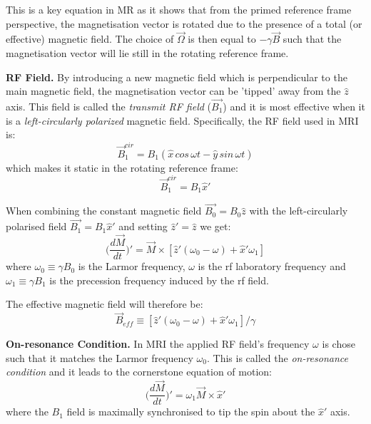This is a key equation in MR as it shows that from the primed reference frame perspective, the magnetisation vector is rotated due to the presence of a total (or effective) magnetic field. The choice of $\vec{\Omega}$ is then equal to $- \gamma \vec{B}$ such that the magnetisation vector will lie still in the rotating reference frame.

\hfill

\textbf{RF Field.} By introducing a new magnetic field which is perpendicular to the main magnetic field, the magnetisation vector can be 'tipped' away from the $\hat{z}$ axis. This field is called the \textit{transmit RF field} ($\vec{B_1}$) and it is most effective when it is a \textit{left-circularly polarized} magnetic field. Specifically, the RF field used in MRI is:
\begin{equation}\label{eq:324}
    \vec{B}_{1}^{cir} = B_1 (\hat{x} \, cos \, \omega t - \hat{y} \, sin \, \omega t)
\end{equation}
which makes it static in the rotating reference frame:
\begin{equation}\label{eq:325}
    \vec{B}_{1}^{cir} = B_1 \hat{x}'
\end{equation}

When combining the constant magnetic field $\vec{B_0} = B_0 \hat{z}$ with the left-circularly polarised field $\vec{B_1} = B_1 \hat{x}'$ and setting $\hat{z}' = \hat{z}$ we get:
\begin{equation}\label{eq:326}
    \Bigg( \frac{d \vec{M} }{dt} \Bigg)' = \vec{M} \times [ \hat{z}'  (\omega_0 - \omega) + \hat{x}' \omega_1]
\end{equation}
where $\omega_0 \equiv \gamma B_0$ is the Larmor frequency, $\omega$ is the rf laboratory frequency and $\omega_1 \equiv \gamma B_1$ is the precession frequency induced by the rf field.

The effective magnetic field will therefore be:
\begin{equation}\label{eq:328}
    \vec{B}_{eff} \equiv [ \hat{z}'  (\omega_0 - \omega) + \hat{x}' \omega_1] / \gamma
\end{equation}

\hfill

\textbf{On-resonance Condition.} 
In MRI the applied RF field's frequency $\omega$ is chose such that it matches the Larmor frequency $\omega_0$. 
This is called the \textit{on-resonance condition} and it leads to the cornerstone equation of motion:
\begin{equation}\label{eq:329}
    \Bigg( \frac{d \vec{M}}{dt} \Bigg)' = \omega_1 \vec{M} \times \hat{x}'
\end{equation}
where the $B_1$ field is maximally synchronised to tip the spin about the $\hat{x}'$ axis.

